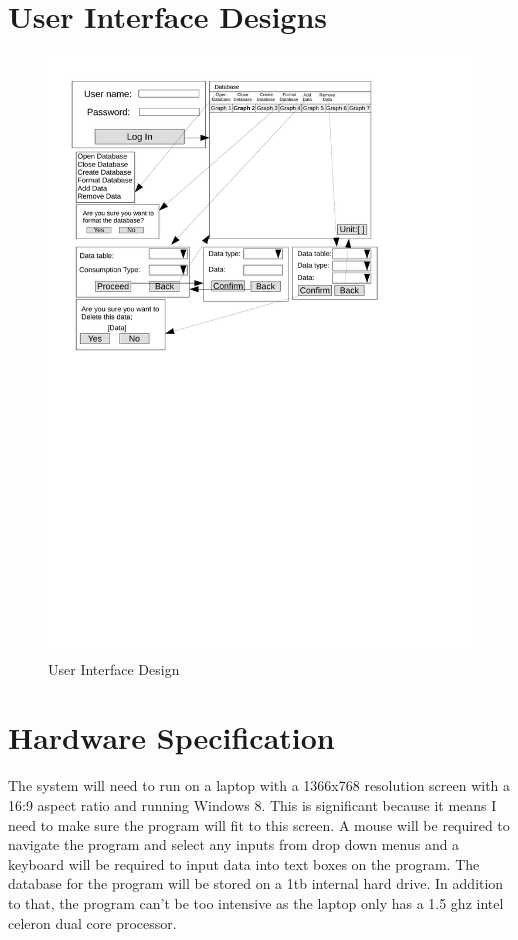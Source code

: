 \section{User Interface Designs}
\begin{landscape}
\begin{figure}[H]
\includegraphics{./design/User Interface Design.pdf}
\caption{User Interface Design}
\end{figure}
\end{landscape}

\section{Hardware Specification}
The system will need to run on a laptop with a 1366x768 resolution screen with a 16:9  aspect ratio and running Windows 8. This is significant because it means I need to make sure the program will fit to this screen. A mouse will be required to navigate the program and select any inputs from drop down menus and a keyboard will be required to input data into text boxes on the program. The database for the program will be stored on a 1tb internal hard drive. In addition to that, the program can't be too intensive as the laptop only has a 1.5 ghz intel celeron dual core processor.
